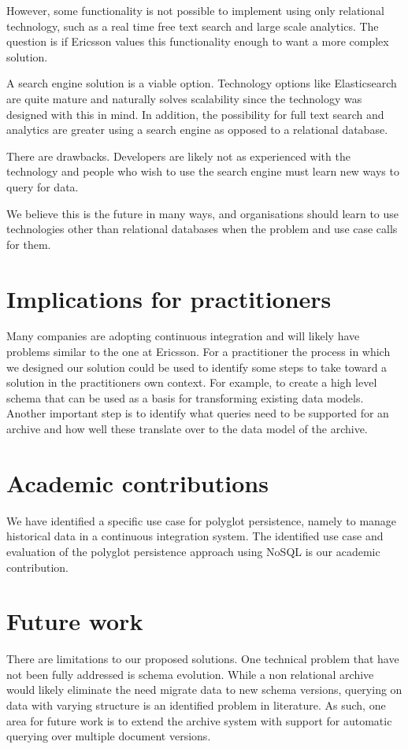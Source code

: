 However, some functionality is not possible to implement using only relational technology, such as a real time free text search and large scale analytics. The question is if Ericsson values this functionality enough to want a more complex solution.

A search engine solution is a viable option. Technology options like Elasticsearch are quite mature and naturally solves scalability since the technology was designed with this in mind. In addition, the possibility for full text search and analytics are greater using a search engine as opposed to a relational database.

There are drawbacks. Developers are likely not as experienced with the technology and people who wish to use the search engine must learn new ways to query for data.

We believe this is the future in many ways, and organisations should learn to use technologies other than relational databases when the problem and use case calls for them.


\section{Implications for practitioners}
Many companies are adopting continuous integration and will likely have problems similar to the one at Ericsson. For a practitioner the process in which we designed our solution could be used to identify some steps to take toward a solution in the practitioners own context. For example, to create a high level schema that can be used as a basis for transforming existing data models. Another important step is to identify what queries need to be supported for an archive and how well these translate over to the data model of the archive.

\section{Academic contributions}
We have identified a specific use case for polyglot persistence, namely to manage historical data in a continuous integration system. The identified use case and evaluation of the polyglot persistence approach using NoSQL is our academic contribution.

\section{Future work}
There are limitations to our proposed solutions. One technical problem that have not been fully addressed is schema evolution. While a non relational archive would likely eliminate the need migrate data to new schema versions, querying on data with varying structure is an identified problem in literature. As such, one area for future work is to extend the archive system with support for automatic querying over multiple document versions.